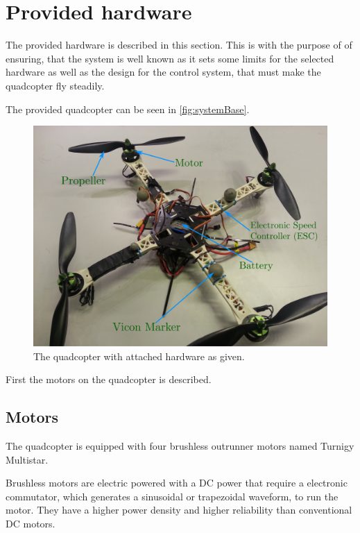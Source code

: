 \section{Provided hardware}\label{sec:hardware}
The provided hardware is described in this section. This is with the purpose of of ensuring, that the system is well known as it sets some limits for the selected hardware as well as the design for the control system, that must make the quadcopter fly steadily.  

\cite{YDing}
The provided quadcopter can be seen in \autoref{fig:systemBase}.
\begin{figure}[H]
  \centering
  \includegraphics[width=.6\linewidth]{figures/quadcopterBaseLabels}
  \caption{The quadcopter with attached hardware as given.}
  \label{fig:systemBase}
\end{figure}
First the motors on the quadcopter is described.
\subsection{Motors}
The quadcopter is equipped with four brushless outrunner motors named Turnigy Multistar. 

Brushless motors are electric powered with a DC power that require a electronic commutator, which generates a sinusoidal or trapezoidal waveform, to run the motor. They have a higher power density and higher reliability than conventional DC motors.

